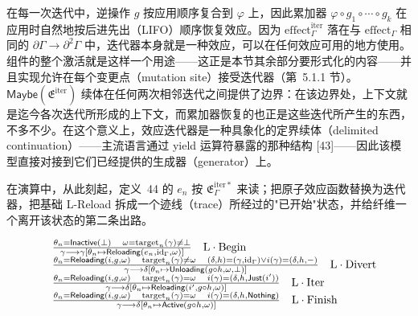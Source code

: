 在每一次迭代中，逆操作 \(g\) 按应用顺序复合到 \(\varphi\) 上，因此累加器 \(\varphi \circ g _ { 1 } \circ \cdots \circ g _ { k }\) 在应用时自然地按后进先出（LIFO）顺序恢复效应。因为 \(\mathrm { e f f e c t } _ { \Gamma } ^ { \mathrm { i t e r } }\) 落在与 \(\mathrm { e f f e c t } _ { \Gamma }\) 相同的 \(\partial \Gamma \to \partial ^ { 2 } \Gamma\) 中，迭代器本身就是一种效应，可以在任何效应可用的地方使用。组件的整个激活就是这样一个用途——这正是本节其余部分要形式化的内容——并且实现允许在每个变更点（mutation site）接受迭代器（第~5.1.1 节）。\(\mathsf { M a y b e } ( \mathfrak { E } ^ { \mathrm { i t e r } } )\) 续体在任何两次相邻迭代之间提供了边界：在该边界处，上下文就是迄今各次迭代所形成的上下文，而累加器恢复的也正是这些迭代所产生的东西，不多不少。在这个意义上，效应迭代器是一种具象化的定界续体（delimited continuation）——主流语言通过 yield 运算符暴露的那种结构 {[}43{]}——因此该模型直接对接到它们已经提供的生成器（generator）上。

在演算中，从此刻起，定义~44 的 \(e _ { n }\) 按 \(\mathfrak { E } _ { \Gamma } ^ { \mathrm { i t e r * } }\) 来读；把原子效应函数替换为迭代器，把基础 L-Reload 拆成一个迹线（trace）所经过的"已开始"状态，并给纤维一个离开该状态的第二条出路。

\[
\begin{array} { r l } & { \frac { \theta _ { n } = \mathsf { I n a c t i v e } ( \perp ) \quad \omega = \mathrm { t a r g e t } _ { n } ( \gamma ) \neq \perp } { \gamma \longrightarrow \gamma [ \theta _ { n } \mapsto \mathsf { R e l o a d i n g } ( e _ { n } , \mathrm { i d } _ { \Gamma } , \omega ) ] } \quad \mathrm { L \cdot B e g i n } } \\ & { \frac { \theta _ { n } = \mathsf { R e l o a d i n g } ( i , g , \omega ) \quad \mathrm { t a r g e t } _ { n } ( \gamma ) \neq \omega \quad ( \delta , h ) = ( \gamma , \mathrm { i d } _ { \Gamma } ) \vee i ( \gamma ) = ( \delta , h , - ) } { \gamma \longrightarrow \delta [ \theta _ { n } \mapsto \mathsf { U n l o a d i n g } ( g \circ h , \omega , \perp ) ] } \quad \mathrm { L \cdot D i v e r t } } \\ & { \frac { \theta _ { n } = \mathsf { R e l o a d i n g } ( i , g , \omega ) \quad \mathrm { t a r g e t } _ { n } ( \gamma ) = \omega \quad i ( \gamma ) = ( \delta , h , \mathsf { J u s t } ( i ^ { \prime } ) ) } { \gamma \longrightarrow \delta [ \theta _ { n } \mapsto \mathsf { R e l o a d i n g } ( i ^ { \prime } , g \circ h , \omega ) ] } \quad \mathrm { L \cdot I t e r } } \\ & { \frac { \theta _ { n } = \mathsf { R e l o a d i n g } ( i , g , \omega ) \quad \mathrm { t a r g e t } _ { n } ( \gamma ) = \omega \quad i ( \gamma ) = ( \delta , h , \mathsf { N o t h i n g } ) } { \gamma \longrightarrow \delta [ \theta _ { n } \mapsto \mathsf { A c t i v e } ( g \circ h , \omega ) ] } \quad \mathrm { L \cdot F i n i s h } } \end{array}
\]

